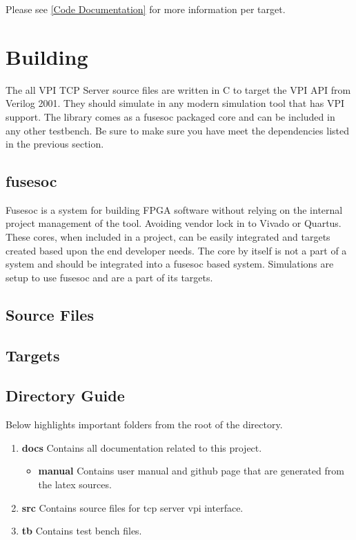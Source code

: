 Please see \ref{Code Documentation} for more information per target.

\section{Building}

\par
The all VPI TCP Server source files are written in C to target the VPI API from Verilog 2001. They should simulate in any modern simulation tool that has VPI support.
The library comes as a fusesoc packaged core and can be included in any other testbench. Be sure to make sure you have meet the dependencies listed in the previous section.

\subsection{fusesoc}
\par
Fusesoc is a system for building FPGA software without relying on the internal project management of the tool. Avoiding vendor lock in to Vivado or Quartus.
These cores, when included in a project, can be easily integrated and targets created based upon the end developer needs. The core by itself is not a part of
a system and should be integrated into a fusesoc based system. Simulations are setup to use fusesoc and are a part of its targets.

\subsection{Source Files}



\subsection{Targets} \label{targets}



\subsection{Directory Guide}

\par
Below highlights important folders from the root of the directory.

\begin{enumerate}
  \item \textbf{docs} Contains all documentation related to this project.
    \begin{itemize}
      \item \textbf{manual} Contains user manual and github page that are generated from the latex sources.
    \end{itemize}
  \item \textbf{src} Contains source files for tcp server vpi interface.
  \item \textbf{tb} Contains test bench files.
\end{enumerate}

